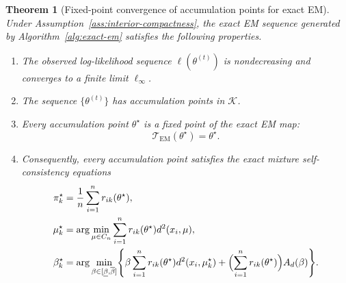\documentclass[11pt]{article}
\newtheorem{theorem}{Theorem}[section]
\begin{document}
\begin{theorem}[Fixed-point convergence of accumulation points for exact EM]\label{thm:em-convergence}
Under Assumption~\ref{ass:interior-compactness}, the exact EM sequence generated by Algorithm~\ref{alg:exact-em} satisfies the following properties.
\begin{enumerate}[label=(\roman*)]
    \item The observed log-likelihood sequence \(\ell(\theta^{(t)})\) is nondecreasing and converges to a finite limit \(\ell_\infty\).
    \item The sequence \(\{\theta^{(t)}\}\) has accumulation points in \(\mathcal{K}\).
    \item Every accumulation point \(\theta^\star\) is a fixed point of the exact EM map:
    \begin{equation}\label{eq:em-fixedpoint}
    \mathcal{T}_{\mathrm{EM}}(\theta^\star)=\theta^\star.
    \end{equation}
    \item Consequently, every accumulation point satisfies the exact mixture self-consistency equations
    \begin{align}
    \pi_k^\star &= \frac1n\sum_{i=1}^n r_{ik}(\theta^\star),\label{eq:self-consistency-pi}\\
    \mu_k^\star &= \arg\min_{\mu\in C_n}\sum_{i=1}^n r_{ik}(\theta^\star)d^2(x_i,\mu),\label{eq:self-consistency-mu}\\
    \beta_k^\star
    &=
    \arg\min_{\beta\in[\underline{\beta},\overline{\beta}]}
    \Biggl\{
    \beta\sum_{i=1}^n r_{ik}(\theta^\star)d^2(x_i,\mu_k^\star)
    +
    \Bigl(\sum_{i=1}^n r_{ik}(\theta^\star)\Bigr)A_d(\beta)
    \Biggr\}.
    \label{eq:self-consistency-beta}
    \end{align}
\end{enumerate}
\end{theorem}
\end{document}
